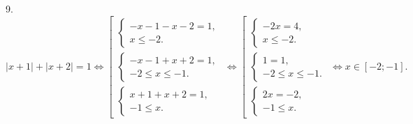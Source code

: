 9. $|x+1|+|x+2|=1\Leftrightarrow \left[\begin{array}{l}\begin{cases} -x-1-x-2=1,\\ x\leqslant -2.\end{cases}\\
\begin{cases} -x-1+x+2=1,\\ -2\leqslant x\leqslant -1 .\end{cases}\\\begin{cases} x+1+x+2=1,\\ -1\leqslant x.\end{cases}\end{array}\right.\Leftrightarrow
 \left[\begin{array}{l}\begin{cases} -2x=4,\\ x\leqslant -2.\end{cases}\\
\begin{cases} 1=1,\\ -2\leqslant x\leqslant -1 .\end{cases}\\\begin{cases} 2x=-2,\\ -1\leqslant x.\end{cases}\end{array}\right.\Leftrightarrow
x\in [-2;-1].$\\
